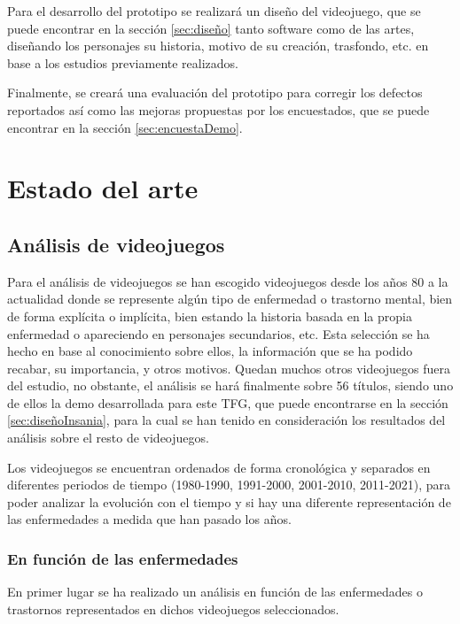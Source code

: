 \documentclass[12pt, a4paper,twoside,titlepage]{book}
\begin{document}
     Para el desarrollo del prototipo se realizará un diseño del videojuego, que se puede encontrar en la sección \ref{sec:diseño} tanto software como de las artes, diseñando los personajes su historia, motivo de su creación, trasfondo, etc. en base a los estudios previamente realizados. 
     
     Finalmente, se creará una evaluación del prototipo para corregir los defectos reportados así como las mejoras propuestas por los encuestados, que se puede encontrar en la sección \ref{sec:encuestaDemo}. 
  
\chapter{Estado del arte}
\label{sec:estadoArte}
\section{Análisis de videojuegos}

Para el análisis de videojuegos se han escogido videojuegos desde los años 80 a la actualidad donde se represente algún tipo de enfermedad o trastorno mental, bien de forma explícita o implícita, bien estando la historia basada en la propia enfermedad o apareciendo en personajes secundarios, etc. Esta selección se ha hecho en base al conocimiento sobre ellos, la información que se ha podido recabar, su importancia, y otros motivos. Quedan muchos otros videojuegos fuera del estudio, no obstante, el análisis se hará finalmente sobre 56 títulos, siendo uno de ellos la demo desarrollada para este TFG, que puede encontrarse en la sección \ref{sec:diseñoInsania}, para la cual se han tenido en consideración los resultados del análisis sobre el resto de videojuegos. 


Los videojuegos se encuentran ordenados de forma cronológica y separados en diferentes periodos de tiempo (1980-1990, 1991-2000, 2001-2010, 2011-2021), para poder analizar la evolución con el tiempo y si hay una diferente representación de las enfermedades a medida que han pasado los años. 

\subsection{En función de las enfermedades} 
    \label{sec:enfermedades}
    En primer lugar se ha realizado un análisis en función de las enfermedades o trastornos representados en dichos videojuegos seleccionados. 
    
\end{document}
